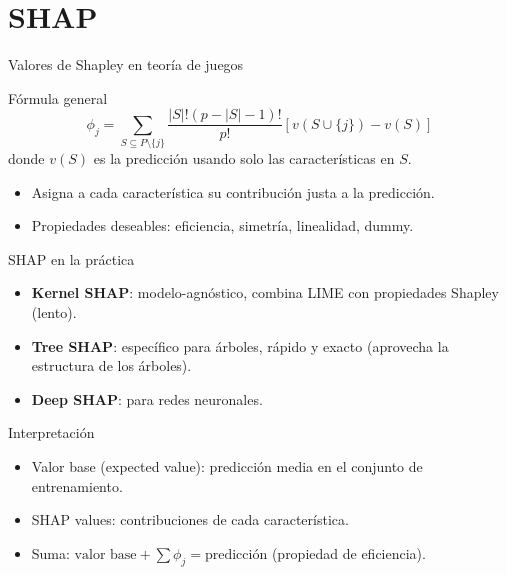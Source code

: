 \documentclass[aspectratio=169, 10pt, xcolor=table]{beamer}
\begin{document}
\section{SHAP}

\begin{frame}{Valores de Shapley en teoría de juegos}
    \begin{block}{Fórmula general}
        \[
        \phi_j = \sum_{S \subseteq P \setminus \{j\}} \frac{|S|!(p - |S| - 1)!}{p!} [v(S \cup \{j\}) - v(S)]
        \]
        donde $v(S)$ es la predicción usando solo las características en $S$.
    \end{block}
    \begin{itemize}
        \item Asigna a cada característica su contribución justa a la predicción.
        \item Propiedades deseables: eficiencia, simetría, linealidad, dummy.
    \end{itemize}
\end{frame}

\begin{frame}{SHAP en la práctica}
    \begin{itemize}
        \item \textbf{Kernel SHAP}: modelo-agnóstico, combina LIME con propiedades Shapley (lento).
        \item \textbf{Tree SHAP}: específico para árboles, rápido y exacto (aprovecha la estructura de los árboles).
        \item \textbf{Deep SHAP}: para redes neuronales.
    \end{itemize}
    \vspace{0.3cm}
    \begin{block}{Interpretación}
        \begin{itemize}
            \item Valor base (expected value): predicción media en el conjunto de entrenamiento.
            \item SHAP values: contribuciones de cada característica.
            \item Suma: $\text{valor base} + \sum \phi_j = \text{predicción}$ (propiedad de eficiencia).
        \end{itemize}
    \end{block}
\end{frame}
\end{document}
